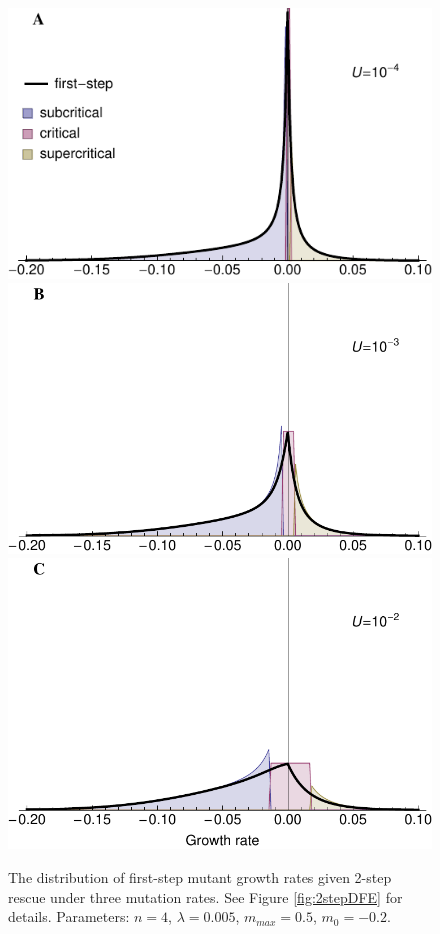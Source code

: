 \documentclass[9pt,twocolumn,twoside,lineno]{gsajnl}
\begin{document}
\begin{figure}[htbp]
\centering
\includegraphics[width=\linewidth]{firststep_smallU.pdf}\\
\includegraphics[width=\linewidth]{firststep_medU.pdf}\\
\includegraphics[width=\linewidth]{firststep_largeU.pdf}
\caption{
The distribution of first-step mutant growth rates given 2-step rescue under three mutation rates. 
See Figure \ref{fig:2stepDFE} for details.
Parameters: $n=4$, $\lambda=0.005$, $m_{max}=0.5$, $m_0=-0.2$.
}%
\label{fig:firststepDFE_mutation}
\end{figure}
\end{document}
